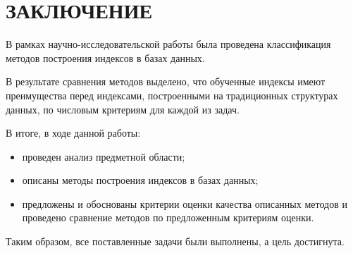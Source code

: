\chapter*{ЗАКЛЮЧЕНИЕ}

В рамках научно-исследовательской работы была проведена классификация методов
построения индексов в базах данных.

В результате сравнения методов выделено, что обученные индексы имеют
преимущества перед индексами, построенными на традиционных структурах данных, по
числовым критериям для каждой из задач.

В итоге, в ходе данной работы:
\begin{itemize}
    \item проведен анализ предметной области;
    \item описаны методы построения индексов в базах данных;
    \item предложены и обоснованы критерии оценки качества описанных методов
      и проведено сравнение методов по предложенным критериям оценки.
\end{itemize}

Таким образом, все поставленные задачи были выполнены, а цель достигнута.
